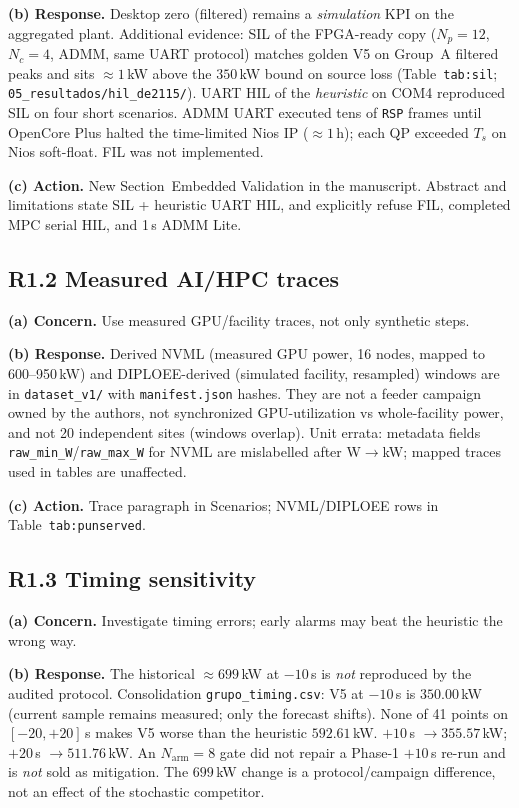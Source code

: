 \documentclass[11pt]{article}
\begin{document}
\textbf{(b) Response.} Desktop zero (filtered) remains a \emph{simulation} KPI on the aggregated plant. Additional evidence: SIL of the FPGA-ready copy ($N_p=12$, $N_c=4$, ADMM, same UART protocol) matches golden V5 on Group~A filtered peaks and sits $\approx 1$\,kW above the $350$\,kW bound on source loss (Table~\texttt{tab:sil}; \texttt{05\_resultados/hil\_de2115/}). UART HIL of the \emph{heuristic} on COM4 reproduced SIL on four short scenarios. ADMM UART executed tens of \texttt{RSP} frames until OpenCore Plus halted the time-limited Nios IP ($\approx 1$\,h); each QP exceeded $T_s$ on Nios soft-float. FIL was not implemented.

\textbf{(c) Action.} New Section~Embedded Validation in the manuscript. Abstract and limitations state SIL + heuristic UART HIL, and explicitly refuse FIL, completed MPC serial HIL, and 1\,s ADMM Lite.

\subsection*{R1.2 Measured AI/HPC traces}
\textbf{(a) Concern.} Use measured GPU/facility traces, not only synthetic steps.

\textbf{(b) Response.} Derived NVML (measured GPU power, 16 nodes, mapped to 600--950\,kW) and DIPLOEE-derived (simulated facility, resampled) windows are in \texttt{dataset\_v1/} with \texttt{manifest.json} hashes. They are not a feeder campaign owned by the authors, not synchronized GPU-utilization vs whole-facility power, and not 20 independent sites (windows overlap). Unit errata: metadata fields \texttt{raw\_min\_W}/\texttt{raw\_max\_W} for NVML are mislabelled after W$\to$kW; mapped traces used in tables are unaffected.

\textbf{(c) Action.} Trace paragraph in Scenarios; NVML/DIPLOEE rows in Table~\texttt{tab:punserved}.

\subsection*{R1.3 Timing sensitivity}
\textbf{(a) Concern.} Investigate timing errors; early alarms may beat the heuristic the wrong way.

\textbf{(b) Response.} The historical $\approx 699$\,kW at $-10$\,s is \emph{not} reproduced by the audited protocol. Consolidation \texttt{grupo\_timing.csv}: V5 at $-10$\,s is $350.00$\,kW (current sample remains measured; only the forecast shifts). None of 41 points on $[-20,+20]$\,s makes V5 worse than the heuristic $592.61$\,kW. $+10$\,s $\to 355.57$\,kW; $+20$\,s $\to 511.76$\,kW. An $N_{\mathrm{arm}}=8$ gate did not repair a Phase-1 $+10$\,s re-run and is \emph{not} sold as mitigation. The $699$\,kW change is a protocol/campaign difference, not an effect of the stochastic competitor.
\end{document}
